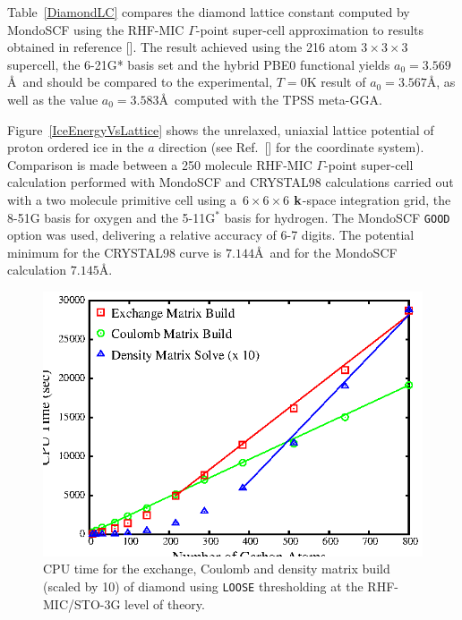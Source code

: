\documentclass[prb,aps,nobibnotes,twocolumn,doublespace,twocolumngrid,superbib,showpacs]{revtex4}
\begin{document}
Table~\ref{DiamondLC}  compares the diamond lattice constant computed by MondoSCF using the RHF-MIC 
$\Gamma$-point super-cell approximation to results obtained in reference [].  
The result achieved using the 216 atom $3 \times 3 \times 3$ 
supercell, the 6-21G* basis set and the hybrid PBE0 functional yields $a_0=3.569$\AA~and should be
compared to the experimental, $T=0$K result of $a_0=3.567$\AA, as well as 
the value $a_0=3.583$\AA~computed with the TPSS meta-GGA\cite{VStaroverov04}.

Figure~\ref{IceEnergyVsLattice} shows the unrelaxed, uniaxial lattice potential of 
proton ordered ice \cite{SCasassa97} in the $a$ direction (see Ref.~[] 
for the coordinate system).  Comparison is made between a 250 molecule RHF-MIC $\Gamma$-point 
super-cell calculation performed with {\sc MondoSCF} and {\sc CRYSTAL98} calculations carried 
out with a two molecule primitive cell using a~$6\times6\times6$ ${\bf k}$-space integration grid, 
the 8-51G basis for oxygen and the 5-11G${^*}$ basis for hydrogen.  The {\sc MondoSCF} {\tt GOOD} 
option was used, delivering a relative accuracy of 6-7 digits. The potential minimum for the 
{\sc CRYSTAL98} curve is $7.144$\AA~and  for the {\sc MondoSCF} calculation $7.145$\AA.

\begin{figure}[h]
\caption{CPU time for the exchange, Coulomb  and density 
matrix build (scaled by 10) of diamond using {\tt LOOSE} thresholding 
at the RHF-MIC/STO-3G level of theory.}
\label{DiamondScaling_1}
{\centering \includegraphics{Timing_Diamond_ONX_1.ps} \par}
\end{figure}
\end{document}
